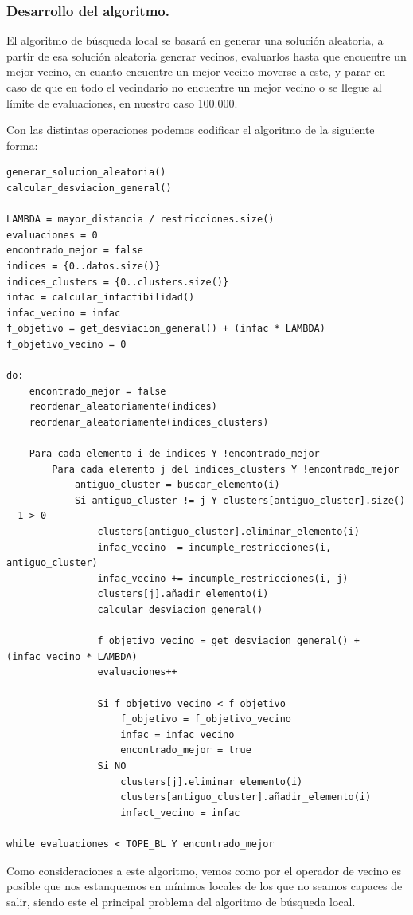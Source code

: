 \documentclass[12pt, spanish]{article}
\begin{document}
\subsubsection{Desarrollo del algoritmo.}

El algoritmo de búsqueda local se basará en generar una solución aleatoria, a partir de esa solución aleatoria generar vecinos, evaluarlos hasta que encuentre un mejor vecino, en cuanto encuentre un mejor vecino moverse a este, y parar en caso de que en todo el vecindario no encuentre un mejor vecino o se llegue al límite de evaluaciones, en nuestro caso 100.000.

\newpage

Con las distintas operaciones podemos codificar el algoritmo de la siguiente forma:

{\small
\begin{lstlisting}
generar_solucion_aleatoria()
calcular_desviacion_general()

LAMBDA = mayor_distancia / restricciones.size()
evaluaciones = 0
encontrado_mejor = false
indices = {0..datos.size()}
indices_clusters = {0..clusters.size()}
infac = calcular_infactibilidad()
infac_vecino = infac
f_objetivo = get_desviacion_general() + (infac * LAMBDA)
f_objetivo_vecino = 0

do:
	encontrado_mejor = false
	reordenar_aleatoriamente(indices)
	reordenar_aleatoriamente(indices_clusters)
	
	Para cada elemento i de indices Y !encontrado_mejor
		Para cada elemento j del indices_clusters Y !encontrado_mejor
			antiguo_cluster = buscar_elemento(i)
			Si antiguo_cluster != j Y clusters[antiguo_cluster].size() - 1 > 0
				clusters[antiguo_cluster].eliminar_elemento(i)
				infac_vecino -= incumple_restricciones(i, antiguo_cluster)
				infac_vecino += incumple_restricciones(i, j)
				clusters[j].añadir_elemento(i)
				calcular_desviacion_general()
				
				f_objetivo_vecino = get_desviacion_general() + (infac_vecino * LAMBDA)
				evaluaciones++				
				
				Si f_objetivo_vecino < f_objetivo
					f_objetivo = f_objetivo_vecino
					infac = infac_vecino
					encontrado_mejor = true
				Si NO
					clusters[j].eliminar_elemento(i)
					clusters[antiguo_cluster].añadir_elemento(i)
					infact_vecino = infac

while evaluaciones < TOPE_BL Y encontrado_mejor
 \end{lstlisting}
 }
 
 
Como consideraciones a este algoritmo, vemos como por el operador de vecino es posible que nos estanquemos en mínimos locales de los que no seamos capaces de salir, siendo este el principal problema del algoritmo de búsqueda local.
\end{document}
